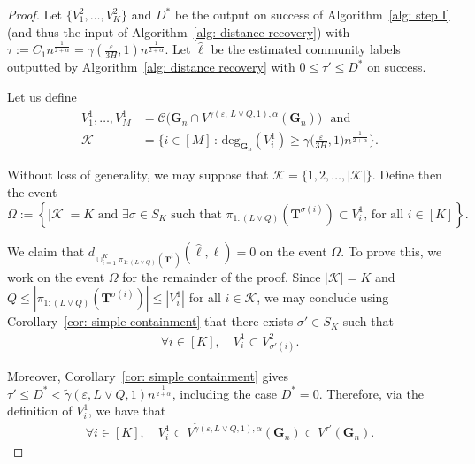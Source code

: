 \documentclass[twoside,11pt]{article}
\theoremstyle{remark}
\begin{document}
\begin{proof}

Let $\{V_1^2,\dots,V_K^2\}$ and $D^*$ be the output on success of Algorithm~\ref{alg: step I} (and thus the input of Algorithm~\ref{alg: distance recovery}) with $\tau := C_1 n^{\frac{1}{2+\alpha}} =\gamma\left(\frac{\varepsilon}{3H}, 1\right)n^{\frac{1}{2+\alpha}}$. Let $\hat{\ell}$ be the estimated community labels outputted by Algorithm~\ref{alg: distance recovery} with $0\leq\tau'\leq D^*$ on success.


Let us define
\begin{align*}
V_1^1, \ldots, V_M^1 &= \mathcal{C}\bigl( \bm{G}_n \cap V^{\tilde{\gamma}(\varepsilon,\, L\vee Q, 1), \alpha}(\bm{G}_n)\bigr) \,\, \text{ and} \\
\mathcal{K} &= \biggl\{ i \in [M] \,: \, \text{deg}_{\bm{G}_n}(V_i^1) \geq \gamma\bigl(\frac{\varepsilon}{3H}, 1\bigr) n^{\frac{1}{2+\alpha}} \biggr\}.
\end{align*}

Without loss of generality, we may suppose that $\mathcal{K} = \{1, 2, \ldots, |\mathcal{K}|\}$. Define then the event
\[
\Omega:=\left\{ |\mathcal{K}| = K \text{ and } \exists \sigma \in S_K \text{ such that }\pi_{1:(L \vee Q)}(\boldsymbol{T}^{\sigma\left(i\right)})\subset V^1_i,\, \text{for all $i\in \left[K\right]$}\right\}.
\]

We claim that $d_{\cup_{i=1}^K \pi_{1:(L \vee Q)}(\bm{T}^i)}(\hat{\ell}, \ell) = 0$ on the event $\Omega$. To prove this, we work on the event $\Omega$ for the remainder of the proof. Since $|\mathcal{K}| = K$ and $Q \leq | \pi_{1:(L\vee Q)}( \bm{T}^{\sigma(i)})| \leq | V_i^1| $ for all $i \in \mathcal{K}$, we may conclude using Corollary~\ref{cor: simple containment} that there exists $\sigma' \in S_K$ such that
\begin{align}
\forall i \in [K], \quad V_i^1 \subset V_{\sigma'(i)}^2. \label{eq: first L key 1}
\end{align}

Moreover, Corollary~\ref{cor: simple containment} gives $\tau'\leq D^*<\tilde{\gamma}(\varepsilon,L\vee Q,1)n^{\frac{1}{2+\alpha}}$, including the case $D^*=0$. 
Therefore, via the definition of $V_i^1$, we have that
\begin{align}
\forall i \in [K],\quad V_i^1 \subset V^{\tilde{\gamma}(\varepsilon, L \vee Q, 1), \alpha}(\bm{G}_n) \subset V^{\tau'}({\bm{G}_n}). \label{eq: first L key 2}
\end{align}


\end{proof}
\end{document}
